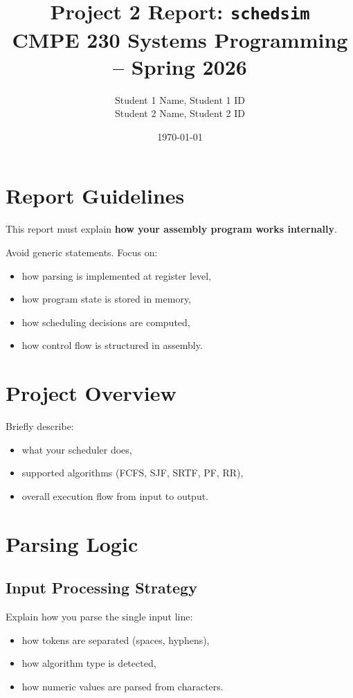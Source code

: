 \documentclass[a4paper,12pt]{article}
\title{Project 2 Report: \texttt{schedsim}\\
\large CMPE 230 Systems Programming -- Spring 2026}
\author{
Student 1 Name, Student 1 ID \\
Student 2 Name, Student 2 ID
}
\date{\today}
\begin{document}
\maketitle

\section*{Report Guidelines}

This report must explain \textbf{how your assembly program works internally}.

Avoid generic statements. Focus on:
\begin{itemize}
\item how parsing is implemented at register level,
\item how program state is stored in memory,
\item how scheduling decisions are computed,
\item how control flow is structured in assembly.
\end{itemize}


\section{Project Overview}

Briefly describe:
\begin{itemize}
\item what your scheduler does,
\item supported algorithms (FCFS, SJF, SRTF, PF, RR),
\item overall execution flow from input to output.
\end{itemize}


\section{Parsing Logic}

\subsection{Input Processing Strategy}

Explain how you parse the single input line:

\begin{itemize}
\item how tokens are separated (spaces, hyphens),
\item how algorithm type is detected,
\item how numeric values are parsed from characters.
\end{itemize}
\end{document}

